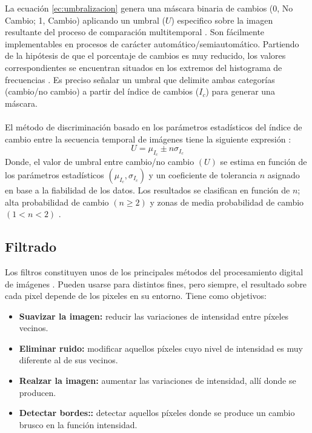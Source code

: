La ecuaci\'on \ref{ec:umbralizacion} genera una m\'ascara binaria de cambios (0, No Cambio; 1, Cambio) aplicando un umbral ($ U $) especifico sobre la imagen resultante del proceso de comparaci\'on multitemporal \cite{singh1989review}. Son f\'acilmente implementables en procesos de car\'acter autom\'atico/semiautom\'atico. Partiendo de la hip\'otesis de que el porcentaje de cambios es muy reducido, los valores correspondientes se encuentran situados en los extremos del histograma de frecuencias \cite{estornell2004analisis}. Es preciso se\~{n}alar un umbral que delimite ambas categorías (cambio/no cambio) a partir del \'indice de cambios ($ I_{c} $)\cite{radke2005image} para generar una m\'ascara.\\~\\
El m\'etodo de discriminaci\'on basado en los par\'ametros estad\'isticos del \'indice de cambio entre la secuencia temporal de im\'agenes tiene la siguiente expresi\'on \cite{rodriguez2010analisis}:
\begin{equation}
U=\mu_{I_{c}} \pm n\sigma _{I_{c}}
\end{equation}
Donde, el valor de umbral entre cambio/no cambio $ (U) $ se estima en funci\'on de los par\'ametros estad\'isticos $ (\mu_{I_{c}}, \sigma_{I_{c}}) $ y un coeficiente de tolerancia $ n $ asignado en base a la fiabilidad de los datos. Los resultados se clasifican en funci\'on de $ n $; alta probabilidad de cambio $ (n \geq 2) $ y
zonas de media probabilidad de cambio $ (1 < n < 2) $ \cite{estornell2004analisis}.

\subsection{Filtrado}
Los filtros constituyen unos de los principales m\'etodos del procesamiento digital de im\'agenes . Pueden usarse para distintos fines, pero siempre, el resultado sobre cada pixel depende de los pixeles en su entorno. Tiene como objetivos: 
	\begin{itemize}
		\item \textbf{Suavizar la imagen:} reducir las variaciones de intensidad entre p\'ixeles vecinos.
		\item \textbf{Eliminar ruido:}  modificar aquellos p\'ixeles cuyo nivel de intensidad es muy diferente al de sus vecinos.
		\item \textbf{Realzar la imagen:} aumentar las variaciones de intensidad, all\'i donde se producen.
		\item \textbf{Detectar bordes::} detectar aquellos p\'ixeles donde se produce un cambio brusco en la funci\'on intensidad.	
	\end{itemize}
